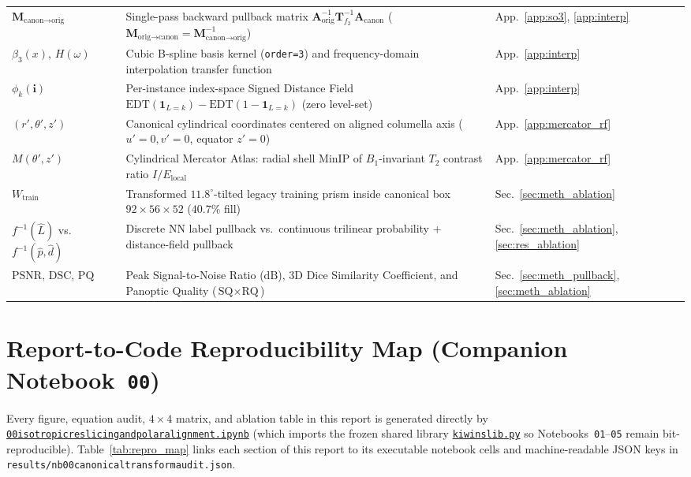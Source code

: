 \documentclass[10pt,a4paper]{article}
\renewcommand{\_}{\origunderscore\allowbreak}
\newcommand{\ghblob}{https://github.com/arvidl/BMED365-2027/blob/main}
\newcommand{\repodir}{Lab4-Comp-Imag/Kiwi-challenge/docs/neurosymbolic-report}
\newcommand{\nbref}[1]{\href{\ghblob/\repodir/notebooks/#1}{\texttt{#1}}}
\begin{document}
{\begin{xltabular}{\textwidth}{L{2.85cm} Y L{2.15cm}}
$\mathbf{M}_{\text{canon}\to\text{orig}}$ & Single-pass backward pullback matrix $\mathbf{A}_{\text{orig}}^{-1}\mathbf{T}_{f_2}^{-1}\mathbf{A}_{\text{canon}}$ ($\mathbf{M}_{\text{orig}\to\text{canon}} = \mathbf{M}_{\text{canon}\to\text{orig}}^{-1}$) & App.~\ref{app:so3}, \ref{app:interp} \\
$\beta_3(x),\, H(\omega)$ & Cubic B-spline basis kernel (\texttt{order=3}) and frequency-domain interpolation transfer function & App.~\ref{app:interp} \\
$\phi_k(\mathbf{i})$ & Per-instance index-space Signed Distance Field $\text{EDT}(\mathbf{1}_{L=k}) - \text{EDT}(1 - \mathbf{1}_{L=k})$ (zero level-set) & App.~\ref{app:interp} \\
$(r', \theta', z')$ & Canonical cylindrical coordinates centered on aligned columella axis ($u'=0, v'=0$, equator $z'=0$) & App.~\ref{app:mercator_rf} \\
$M(\theta', z')$ & Cylindrical Mercator Atlas: radial shell MinIP of $B_1$-invariant $T_2$ contrast ratio $I/E_{\text{local}}$ & App.~\ref{app:mercator_rf} \\
$W_{\text{train}}$ & Transformed $11.8^\circ$-tilted legacy training prism inside canonical box $92\times 56\times 52$ ($40.7\%$ fill) & Sec.~\ref{sec:meth_ablation} \\
$f^{-1}(\hat{L})$ vs.\ $f^{-1}(\hat{p},\hat{d})$ & Discrete NN label pullback vs.\ continuous trilinear probability + distance-field pullback & Sec.~\ref{sec:meth_ablation}, \ref{sec:res_ablation} \\
$\text{PSNR},\, \text{DSC},\, \text{PQ}$ & Peak Signal-to-Noise Ratio ($\text{dB}$), 3D Dice Similarity Coefficient, and Panoptic Quality ($\text{SQ}\times\text{RQ}$) & Sec.~\ref{sec:meth_pullback}, \ref{sec:meth_ablation} \\
\end{xltabular}
\addtocounter{table}{-1}
}

\clearpage
\section*{Report-to-Code Reproducibility Map (Companion Notebook~\texttt{00})}

Every figure, equation audit, $4\times 4$ matrix, and ablation table in this report is generated directly by \nbref{00\_isotropic\_reslicing\_and\_polar\_alignment.ipynb} (which imports the frozen shared library \nbref{kiwi\_ns\_lib.py} so Notebooks~\texttt{01}--\texttt{05} remain bit-reproducible). Table~\ref{tab:repro_map} links each section of this report to its executable notebook cells and machine-readable JSON keys in \texttt{results/nb00\_canonical\_transform\_audit.json}.
\end{document}

